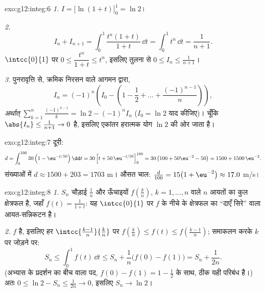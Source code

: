 \begin{solution}{exo:g12:integ:6}
\emph{1.} $I = \bigl[\ln(1+t)\bigr]_0^1 = \ln 2$।

\emph{2.}
\[
I_n + I_{n+1} = \int_0^1 \frac{t^n(1 + t)}{1+t}\,\dd t
= \int_0^1 t^n \,\dd t = \frac{1}{n+1}.
\]
$\intcc{0}{1}$ पर $0 \leq \dfrac{t^n}{1+t} \leq t^n$, इसलिए तुलना से $0 \leq I_n \leq \frac{1}{n+1}$।

\emph{3.} पुनरावृत्ति से, क्रमिक निरसन वाले आगमन द्वारा,
\[
I_n = (-1)^n\left(I_0 - \left(1 - \frac12 + \dots + \frac{(-1)^{n-1}}{n}\right)\right),
\]
\emph{अर्थात्}
$\displaystyle\sum_{k=1}^{n} \frac{(-1)^{k-1}}{k} = \ln 2 - (-1)^n I_n$
($I_0 = \ln 2$ याद कीजिए)। चूँकि $\abs{I_n} \leq \frac{1}{n+1} \to 0$ है, इसलिए एकांतर हरात्मक योग $\ln 2$ की ओर जाता है।
\end{solution}

\begin{solution}{exo:g12:integ:7}
दूरी:
\[
d = \int_0^{100} 30\left(1 - \eu^{-t/50}\right)\dd t
= 30\left[t + 50\,\eu^{-t/50}\right]_0^{100}
= 30\left(100 + 50\eu^{-2} - 50\right)
= 1500 + 1500\,\eu^{-2}.
\]
संख्याओं में $d \approx 1500 + 203 = 1703$ m। औसत चाल: $\frac{d}{100} = 15\bigl(1 + \eu^{-2}\bigr) \approx 17.0$ m/s।
\end{solution}

\begin{solution}{exo:g12:integ:8}
\emph{1.} $S_n$ चौड़ाई $\frac1n$ और ऊँचाइयों $f\left(\frac kn\right)$, $k = 1, \dots, n$ वाले $n$ आयतों का कुल
क्षेत्रफल है, जहाँ $f(t) = \frac{1}{1+t}$: यह $\intcc{0}{1}$ पर $f$ के नीचे के क्षेत्रफल का ``दाएँ सिरे''
वाला आयत-सन्निकटन है।

\emph{2.} $f$  है, इसलिए हर  $\intcc{\frac{k-1}{n}}{\frac kn}$ पर $f\left(\frac kn\right) \leq f(t) \leq f\left(\frac{k-1}{n}\right)$; समाकलन करके $k$
पर जोड़ने पर:
\[
S_n \leq \int_0^1 f(t)\,\dd t \leq S_n + \frac1n\bigl(f(0) - f(1)\bigr)
= S_n + \frac{1}{2n}.
\]
(अभ्यास के प्रदर्शन का बीच वाला पद, $f(0) - f(1) = 1 - \frac12$ के साथ, ठीक यही परिबंध है।) अतः
$0 \leq \ln 2 - S_n \leq \frac{1}{2n} \to 0$, इसलिए $S_n \to \ln 2$।
\end{solution}

